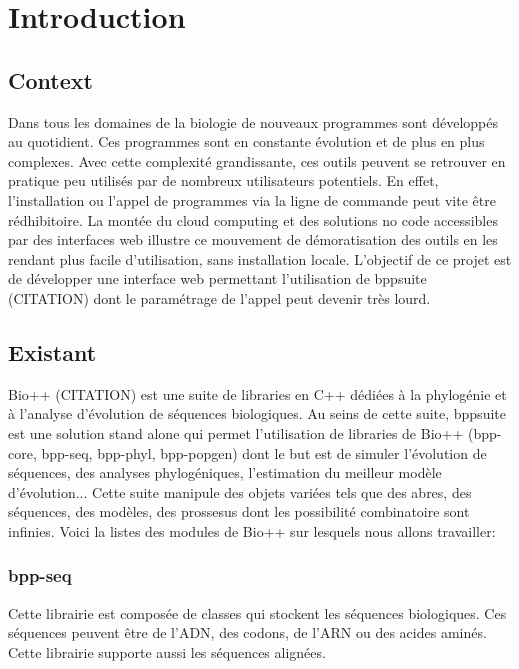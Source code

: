 
\section{Introduction}	%

\subsection{Context}
	
	
	Dans tous les domaines de la biologie de nouveaux programmes sont développés au quotidient. Ces programmes sont en constante évolution et de plus en plus complexes. Avec cette complexité grandissante, ces outils peuvent se retrouver en pratique peu utilisés par de nombreux utilisateurs potentiels. En effet, l'installation ou l'appel de programmes via la ligne de commande peut vite être rédhibitoire.
	La montée du cloud computing et des solutions no code accessibles par des interfaces web illustre ce mouvement de démoratisation des outils en les rendant plus facile d'utilisation, sans installation locale.
	L'objectif de ce projet est de développer une interface web permettant l'utilisation de bppsuite (CITATION) dont le paramétrage de l'appel peut devenir très lourd.
	
	
\subsection{Existant}
	Bio++ (CITATION) est une suite de libraries en C++ dédiées à la phylogénie et à l'analyse d'évolution de séquences biologiques. Au seins de cette suite, bppsuite est une solution stand alone qui permet l'utilisation de libraries de Bio++ (bpp-core, bpp-seq, bpp-phyl, bpp-popgen) dont le but est de simuler l'évolution de séquences, des analyses phylogéniques, l'estimation du meilleur modèle d'évolution... Cette suite manipule des objets variées tels que des abres, des séquences, des modèles, des prossesus dont les possibilité combinatoire sont infinies. Voici la listes des modules de Bio++ sur lesquels nous allons travailler:
	
	\subsubsection*{bpp-seq}
	Cette librairie est composée de classes qui stockent les séquences biologiques. Ces séquences peuvent être de l'ADN, des codons, de l'ARN ou des acides aminés. Cette librairie supporte aussi les séquences alignées.
	
